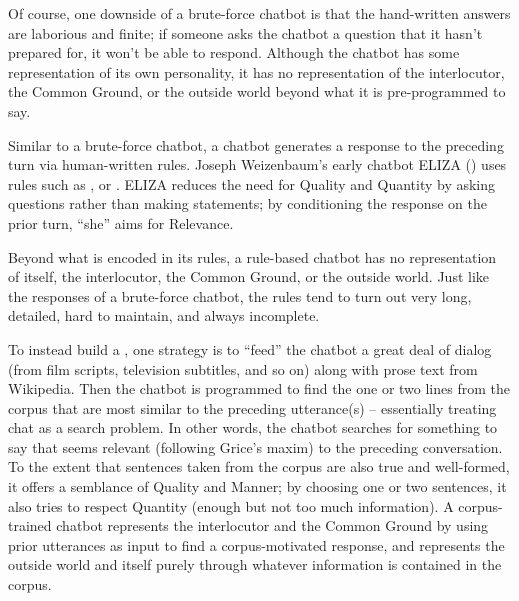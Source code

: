 Of course, one downside of a brute-force chatbot is that the hand-written answers are laborious and finite; if someone asks the chatbot a question that it hasn't prepared for, it won't be able to respond.  Although the chatbot has some representation of its own personality, it has no representation of the interlocutor, the Common Ground, or the outside world beyond what it is pre-programmed to say.


Similar to a brute-force chatbot, a  chatbot generates a response to the preceding turn via human-written rules.  Joseph Weizenbaum's early chatbot ELIZA (\citeyear{Weizenbaum:1966}) uses rules such as , or . ELIZA reduces the need for Quality and Quantity by asking questions rather than making statements; by conditioning the response on the prior turn, ``she'' aims for Relevance. 

Beyond what is encoded in its rules, a rule-based chatbot has no representation of itself, the interlocutor, the Common Ground, or the outside world.
Just like the responses of a brute-force chatbot, the rules 
tend to turn out very long,  detailed, hard to maintain,
and always incomplete. 


To instead build a ,  one strategy is to ``feed'' the chatbot a great deal of dialog (from film scripts, television subtitles, and so on) along with  prose text from Wikipedia.  Then the chatbot is programmed to find the one or two lines from the corpus that are most similar to the preceding utterance(s) -- essentially treating chat as a search problem.  In other words, the chatbot searches for something to say that seems relevant (following Grice's maxim) to the preceding conversation.  To the extent that sentences taken from the corpus are also true and well-formed, it offers a semblance of Quality and Manner; by choosing one or two sentences, it also tries to respect Quantity (enough but not too much information).  A corpus-trained chatbot represents the interlocutor and the Common Ground by using prior utterances as input to find a corpus-motivated response, and represents the outside world and itself purely through whatever information is contained in the corpus.  

